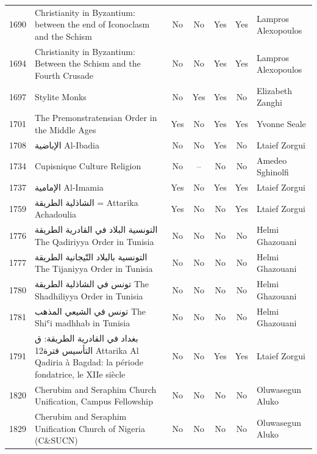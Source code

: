 {\begin{longtable}{rp{3.5cm}ccccp{3cm}}
1690 & {\raggedright Christianity in Byzantium: between the end of Iconoclasm and the Schism} & No & No & Yes & Yes & {\raggedright Lampros Alexopoulos} \\
1694 & {\raggedright Christianity in Byzantium: Between the Schism and the Fourth Crusade} & No & No & Yes & Yes & {\raggedright Lampros Alexopoulos} \\
1697 & {\raggedright Stylite Monks} & No & Yes & Yes & No & {\raggedright Elizabeth Zanghi} \\
1701 & {\raggedright The Premonstratensian Order in the Middle Ages} & Yes & No & Yes & Yes & {\raggedright Yvonne Seale} \\
1708 & {\raggedright {\arabicfont الإباضية}  Al-Ibadia} & No & No & Yes & No & {\raggedright Ltaief Zorgui} \\
1734 & {\raggedright Cupisnique Culture Religion} & No & -- & No & No & {\raggedright Amedeo Sghinolfi} \\
1737 & {\raggedright {\arabicfont الإمامية} Al-Imamia} & Yes & No & Yes & Yes & {\raggedright Ltaief Zorgui} \\
1759 & {\raggedright {\arabicfont الشاذلية الطريقة} = Attarika Achadoulia} & Yes & No & No & Yes & {\raggedright Ltaief Zorgui} \\
1776 & {\raggedright {\arabicfont التونسية البلاد في القادرية الطريقة} The Qadiriyya Order in Tunisia} & No & No & No & No & {\raggedright Helmi Ghazouani} \\
1777 & {\raggedright {\arabicfont التونسية بالبلاد التّيجانية الطريقة} The Tijaniyya Order in Tunisia} & No & No & No & No & {\raggedright Helmi Ghazouani} \\
1780 & {\raggedright {\arabicfont تونس في الشاذلية الطريقة} The Shadhiliyya Order in Tunisia} & No & No & No & No & {\raggedright Helmi Ghazouani} \\
1781 & {\raggedright {\arabicfont تونس في الشيعي المذهب} The Shiʿi madhhab in Tunisia} & No & No & No & No & {\raggedright Helmi Ghazouani} \\
1791 & {\raggedright {\arabicfont بغداد في القادرية الطريقة}: {\arabicfont ق التأسيس فترة}12 Attarika Al Qadiria à Bagdad: la période fondatrice, le XIIe siècle} & No & No & Yes & Yes & {\raggedright Ltaief Zorgui} \\
1820 & {\raggedright Cherubim and Seraphim Church Unification, Campus Fellowship} & No & No & No & No & {\raggedright Oluwasegun Aluko} \\
1829 & {\raggedright Cherubim and Seraphim Unification Church of Nigeria (C\&SUCN)} & No & No & No & No & {\raggedright Oluwasegun Aluko} \\

\end{longtable}}
